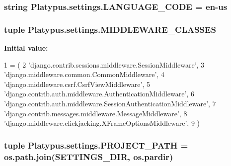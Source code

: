 \subsubsection[{L\+A\+N\+G\+U\+A\+G\+E\+\_\+\+C\+O\+D\+E}]{\setlength{\rightskip}{0pt plus 5cm}string Platypus.\+settings.\+L\+A\+N\+G\+U\+A\+G\+E\+\_\+\+C\+O\+D\+E = \textquotesingle{}en-\/us\textquotesingle{}}\label{namespace_platypus_1_1settings_a0cb66ded6846c00b50227be07adf9ace}
\hypertarget{namespace_platypus_1_1settings_acb5170bcce1c81463df5170c9e53b4e3}{}
\subsubsection[{M\+I\+D\+D\+L\+E\+W\+A\+R\+E\+\_\+\+C\+L\+A\+S\+S\+E\+S}]{\setlength{\rightskip}{0pt plus 5cm}tuple Platypus.\+settings.\+M\+I\+D\+D\+L\+E\+W\+A\+R\+E\+\_\+\+C\+L\+A\+S\+S\+E\+S}\label{namespace_platypus_1_1settings_acb5170bcce1c81463df5170c9e53b4e3}
{\bfseries Initial value\+:}
\begin{DoxyCode}
1 = (
2     \textcolor{stringliteral}{'django.contrib.sessions.middleware.SessionMiddleware'},
3     \textcolor{stringliteral}{'django.middleware.common.CommonMiddleware'},
4     \textcolor{stringliteral}{'django.middleware.csrf.CsrfViewMiddleware'},
5     \textcolor{stringliteral}{'django.contrib.auth.middleware.AuthenticationMiddleware'},
6     \textcolor{stringliteral}{'django.contrib.auth.middleware.SessionAuthenticationMiddleware'},
7     \textcolor{stringliteral}{'django.contrib.messages.middleware.MessageMiddleware'},
8     \textcolor{stringliteral}{'django.middleware.clickjacking.XFrameOptionsMiddleware'},
9 )
\end{DoxyCode}
\hypertarget{namespace_platypus_1_1settings_abe93a21756340e9e7fdc8c80db00735e}{}
\subsubsection[{P\+R\+O\+J\+E\+C\+T\+\_\+\+P\+A\+T\+H}]{\setlength{\rightskip}{0pt plus 5cm}tuple Platypus.\+settings.\+P\+R\+O\+J\+E\+C\+T\+\_\+\+P\+A\+T\+H = os.\+path.\+join({\bf S\+E\+T\+T\+I\+N\+G\+S\+\_\+\+D\+I\+R}, os.\+pardir)}\label{namespace_platypus_1_1settings_abe93a21756340e9e7fdc8c80db00735e}
\hypertarget{namespace_platypus_1_1settings_a79c6cca950bb10c5d935bcba5682eeee}{}
